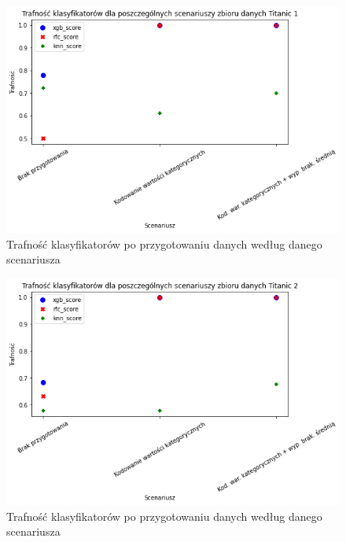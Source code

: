 \documentclass{book}
\begin{document}
\begin{figure}[H]
\centerline{\includegraphics[scale=0.5]{Titanic_1_Kodowanie}}
\centering
\caption{Trafność klasyfikatorów po przygotowaniu danych 
według danego scenariusza}
\end{figure}

\begin{figure}[H]
\centerline{\includegraphics[scale=0.5]{Titanic_2_Kodowanie}}
\centering
\caption{Trafność klasyfikatorów po przygotowaniu danych 
według danego scenariusza}
\end{figure}
\end{document}
